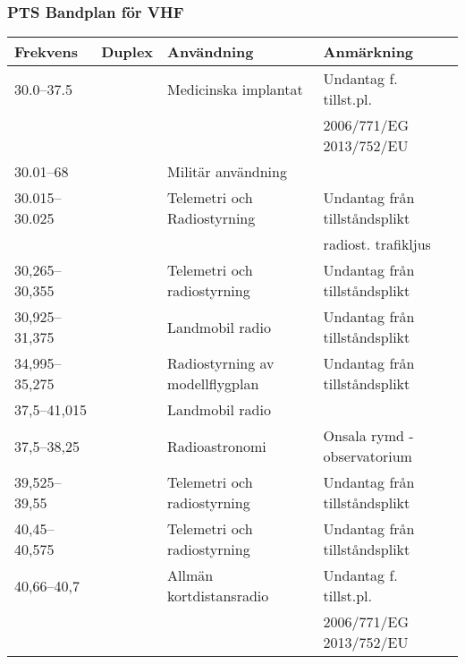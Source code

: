 \begin{landscape}
\small
\subsubsection{PTS Bandplan för VHF}
\begin{longtable}{llll}
	\textbf{Frekvens}  & \textbf{Duplex}    & \textbf{Användning}                   & \textbf{Anmärkning}            \\ \hline
	\endhead
	30.0--37.5         &                    & Medicinska implantat                  & Undantag f. tillst.pl.         \\
	                   &                    &                                       & 2006/771/EG 2013/752/EU        \\
	30.01--68          &                    & Militär användning                    &                                \\
	30.015--30.025     &                    & Telemetri och Radiostyrning           & Undantag från tillståndsplikt  \\
	                   &                    &                                       & radiost. trafikljus            \\
	30,265--30,355     &                    & Telemetri och radiostyrning           & Undantag från tillståndsplikt  \\
	30,925--31,375     &                    & Landmobil radio                       & Undantag från tillståndsplikt  \\
	34,995--35,275     &                    & Radiostyrning av modellflygplan       & Undantag från tillståndsplikt  \\
	37,5--41,015       &                    & Landmobil radio                       &                                \\
	37,5--38,25        &                    & Radioastronomi                        & Onsala rymd - observatorium    \\
	39,525--39,55      &                    & Telemetri och radiostyrning           & Undantag från tillståndsplikt  \\
	40,45--40,575      &                    & Telemetri och radiostyrning           & Undantag från tillståndsplikt  \\
	40,66--40,7        &                    & Allmän kortdistansradio               & Undantag f. tillst.pl.         \\
	                   &                    &                                       & 2006/771/EG 2013/752/EU        \\

\end{longtable}
\end{landscape}
